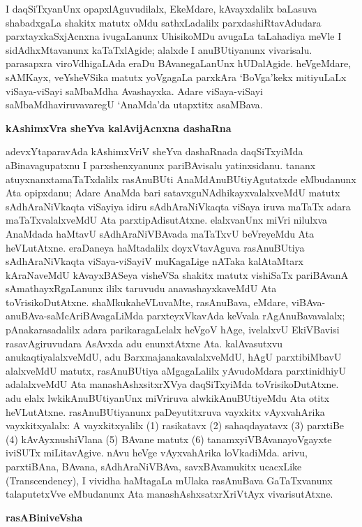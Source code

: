 I daqSiTxyanUnx opapxlAguvudilalx, EkeMdare, kAvayxdalilx baLasuva shabadxgaLa shakitx matutx oMdu sathxLadalilx parxdashiRtavAdudara parxtayxkaSxjAcnxna ivugaLanunx UhisikoMDu avugaLa taLahadiya meVle I sidAdhxMtavanunx kaTaTxlAgide; alalxde I anuBUtiyanunx vivarisalu. parasapxra viroVdhigaLAda eraDu BAvanegaLanUnx hUDalAgide. heVgeMdare, sAMKayx, veYsheVSika matutx yoVgagaLa parxkAra `BoVga'kekx mitiyuLaLx viSaya-viSayi saMbaMdha Avashayxka. Adare viSaya-viSayi saMbaMdhaviruvavaregU `AnaMda'da utapxtitx asaMBava.

\bigskip
\begin{center}
{\Large\bf kAshimxVra sheYva kalAvijAcnxna dashaRna}
\end{center}

adevxYtaparavAda kAshimxVriV sheYva dashaRnada daqSiTxyiMda aBinavagupatxnu I parxshenx\-yanunx pariBAvisalu yatinxsidanu. tananx atuyxnanxtamaTaTxdalilx rasAnuBUti AnaMdAnu\-BUtiyAgutatxde eMbudanunx Ata opipxdanu; Adare AnaMda bari satavxguNAdhikayxvalalx\-veMdU matutx sAdhAraNiVkaqta viSayiya idiru sAdhAraNiVkaqta viSaya iruva maTaTx adara maTaTxvalalxveMdU Ata parxtipAdisutAtxne. elalxvanUnx miVri nilulxva AnaMdada haMtavU sAdhAraNiVBAvada maTaTxvU beVreyeMdu Ata heVLutAtxne. eraDaneya haMta\-dalilx doyxVtavAguva rasAnuBUtiya sAdhAraNiVkaqta viSaya-viSayiV muKagaLige nATaka kalAtaMtarx kAraNaveMdU kAvayxBASeya visheVSa shakitx matutx vishiSaTx pariBAvanA sAmathayxRgaLanunx ililx taruvudu anavashayxkaveMdU Ata toVrisikoDutAtxne. shaMkuka\break heVLuvaMte, rasAnuBava, eMdare, viBAva-anuBAva-saMcAriBAvagaLiMda parxteyxVka\-vAda keVvala rAgAnuBavavalalx; pAnakarasadalilx adara parikaragaLelalx heVgoV hAge, ivelalxvU EkiVBavisi rasavAgiruvudara AsAvxda adu enunxtAtxne Ata. kalAvasutxvu anukaqtiyalalxveMdU, adu BarxmajanakavalalxveMdU, hAgU parxtibiMbavU alalxveMdU matutx, rasAnuBUtiya aMgagaLalilx yAvudoMdara parxtinidhiyU adalalxveMdU Ata manashAshxsitxrXVya daqSiTxyiMda toVrisikoDutAtxne. adu elalx lwkikAnuBUtiyanUnx miVriruva alwkikAnuBUtiyeMdu Ata otitx heVLutAtxne. rasAnuBUtiyanunx paDeyutitxruva vayxkitx vAyxvahArika vayxkitxyalalx: A vayxkitxyalilx (1) rasikatavx (2) sahaqdayatavx (3) parxtiBe (4) kAvAyxnushiVlana (5) BAvane matutx (6) tanamxyiVBAvanayoVgayxte iviSUTx miLitavAgive. nAvu heVge vAyxvahArika loVkadiMda. arivu, parxtiBAna, BAvana, sAdhAraNiVBAva, savxBAvamukitx ucacxLike {\rm(Transcendency)}, I vividha haMtagaLa mUlaka rasAnuBava GaTaTxvanunx talaputetxVve eMbudanunx Ata manashAshxsatxrXriVtAyx vivarisutAtxne.

\smallskip
\begin{center}
{\Large\bf rasABiniveVsha}
\end{center}

